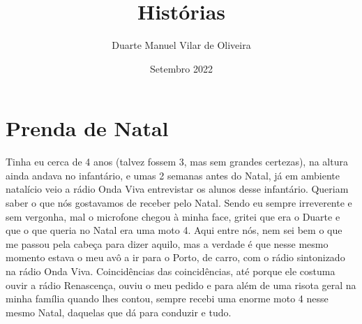 \documentclass{article}
\title{Histórias}
\author{Duarte Manuel Vilar de Oliveira }
\date{Setembro  2022}
\begin{document}
\maketitle
\chapter{Prenda de Natal}
Tinha eu cerca de 4 anos (talvez fossem 3, mas sem grandes certezas), na altura ainda andava no infantário, e umas 2 semanas antes do Natal, já em ambiente natalício
veio a rádio Onda Viva entrevistar os alunos desse infantário. Queriam saber o que nós gostavamos de receber pelo Natal.
Sendo eu sempre irreverente e sem vergonha, mal o microfone chegou à minha face, gritei que era o Duarte e que o que queria no Natal era uma moto 4. 
Aqui entre nós, nem sei bem o que me passou pela cabeça para dizer aquilo, mas a verdade é que nesse mesmo momento estava o meu avô a ir para o Porto, de carro, com o rádio sintonizado na rádio Onda Viva.
Coincidências das coincidências, até porque ele costuma ouvir a rádio Renascença, ouviu o meu pedido e para além de uma risota geral na minha família quando lhes contou, sempre recebi uma enorme moto 4 nesse mesmo Natal, daquelas que dá para conduzir e tudo.  
\end{document}
